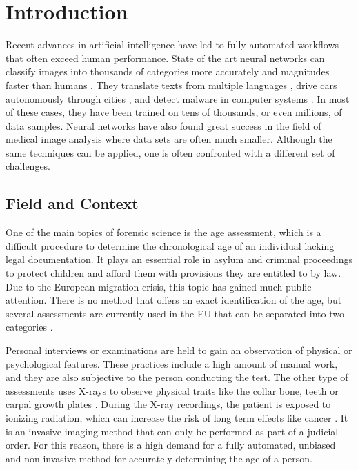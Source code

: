 \section{Introduction}

Recent advances in artificial intelligence have led to fully automated workflows that often exceed human performance. State of the art neural networks can classify images into thousands of categories more accurately and magnitudes faster than humans \cite{He2015a}. They translate texts from multiple languages \cite{Wu2016}, drive cars autonomously through cities \cite{Bojarski2017}, and detect malware in computer systems \cite{Saxe2015}. In most of these cases, they have been trained on tens of thousands, or even millions, of data samples. Neural networks have also found great success in the field of medical image analysis where data sets are often much smaller. Although the same techniques can be applied, one is often confronted with a different set of challenges.

\subsection{Field and Context}

One of the main topics of forensic science is the age assessment, which is a difficult procedure to determine the chronological age of an individual lacking legal documentation. It plays an essential role in asylum and criminal proceedings to protect children and afford them with provisions they are entitled to by law. Due to the European migration crisis, this topic has gained much public attention. There is no method that offers an exact identification of the age, but several assessments are currently used in the EU that can be separated into two categories \cite{EuropeanAsylumSupportOffice2013}.

Personal interviews or examinations are held to gain an observation of physical or psychological features. These practices include a high amount of manual work, and they are also subjective to the person conducting the test. The other type of assessments uses X-rays to observe physical traits like the collar bone, teeth or carpal growth plates \cite{EuropeanAsylumSupportOffice2013}. During the X-ray recordings, the patient is exposed to ionizing radiation, which can increase the risk of long term effects like cancer \cite{WorldHealthOrganization2016}. It is an invasive imaging method that can only be performed as part of a judicial order. For this reason, there is a high demand for a fully automated, unbiased and non-invasive method for accurately determining the age of a person.

